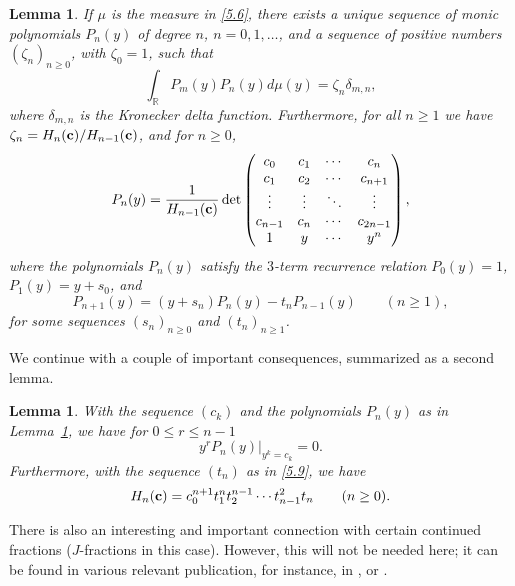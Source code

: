 \documentclass{amsart}
\theoremstyle{plain}
\newtheorem{lemma}[theorem]{Lemma}
\numberwithin{equation}{section}
\begin{document}
\begin{lemma}\label{lem:5.5}
If $\mu$ is the measure in \eqref{5.6}, there exists a unique sequence of monic
polynomials $P_n(y)$ of degree $n$, $n=0, 1, \ldots$, and a sequence of positive
numbers $(\zeta_n)_{n\geq 0}$, with $\zeta_0=1$, such that 
\begin{equation}\label{5.7}
\int_{\mathbb R}P_m(y)P_n(y)d\mu(y) = \zeta_n\delta_{m,n},
\end{equation}
where $\delta_{m,n}$ is the Kronecker delta function. Furthermore, for all 
$n\geq 1$ we have $\zeta_n=H_n({\bf c})/H_{n-1}({\bf c})$, and for $n\geq 0$,
\begin{equation}\label{5.8}
P_n(y) = \frac{1}{H_{n-1}({\bf c})}\det
\begin{pmatrix}
c_{0} & c_{1} & \cdots & c_{n}\\
c_{1} & c_{2} & \cdots & c_{n+1}\\
\vdots & \vdots & \ddots & \vdots\\
c_{n-1} & c_{n} & \cdots & c_{2n-1} \\
1 & y & \cdots & y^n
\end{pmatrix},
\end{equation}
where the polynomials $P_n(y)$ satisfy the $3$-term recurrence relation 
$P_0(y)=1$, $P_1(y)=y+s_0$, and
\begin{equation}\label{5.9}
P_{n+1}(y) = (y+s_n)P_n(y) - t_nP_{n-1}(y)\qquad (n\geq 1),
\end{equation}
for some sequences $(s_n)_{n\geq 0}$ and $(t_n)_{n\geq 1}$.
\end{lemma}

We continue with a couple of important consequences, summarized as a second
lemma.

\begin{lemma}\label{lem:5.6}
With the sequence $(c_k)$ and the polynomials $P_n(y)$ as in 
Lemma~\ref{lem:5.5}, we have for $0\leq r\leq n-1$
\begin{equation}\label{5.10}
y^rP_n(y)\bigg|_{y^k=c_k} = 0.
\end{equation}
Furthermore, with the sequence $(t_n)$ as in \eqref{5.9}, we have 
\begin{equation}\label{5.11}
H_n({\bf c}) = c_0^{n+1}t_1^nt_2^{n-1}\cdots t_{n-1}^2t_n\qquad (n\geq 0).
\end{equation}
\end{lemma}

There is also an interesting and important connection with certain continued
fractions ($J$-fractions in this case). However, this will not be needed here;
it can be found in various relevant publication, for instance, in
\cite[p.~20]{Kr}, or \cite[Sect.~3]{DJ}.
\end{document}
